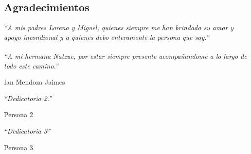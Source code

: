 
\begin{comment}
\begin{acknowledgements}

También quisiera reconocer a ... por ...CONACYT,  PAPIIT / etc.
\end{acknowledgements}
\end{comment}

\begin{alwayssingle}
	{
		\pagestyle{empty}
		\vspace{1.5cm}
		{\chapter*{Agradecimientos}
			\noindent 
			\textit{``A mis padres Lorena y Miguel, quienes siempre me han brindado su amor y apoyo incondional y a quienes debo enteramente la persona que soy.''} \\
			\\
			\textit{``A mi hermana Natzue, por estar siempre presente acompañandome a lo largo de todo este camino.''}
			\begin{flushright}
				Ian Mendoza Jaimes
			\end{flushright}
			\noindent 
			\textit{``Dedicatoria 2.''}
			\begin{flushright}
				Persona 2
			\end{flushright}
			\noindent 
			\textit{``Dedicatoria 3''}
			\begin{flushright}
				Persona 3
			\end{flushright}
			
		}
	}
	
\end{alwayssingle}



